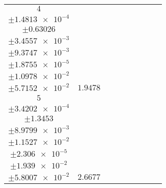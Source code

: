 \documentclass[8pt]{article}
\begin{document}
\begin{longtable}[l]{c c c c c c c c c}
$\num{4}$ & \begin{tabular}[c]{@{}c@{}}$\num{2.765e-2}$ \\ $\pm\num{1.4813e-4}$\end{tabular} & \begin{tabular}[c]{@{}c@{}}$\num{-0.87193}$ \\ $\pm\num{0.63026}$\end{tabular} & \begin{tabular}[c]{@{}c@{}}$\num{-3.7147}$ \\ $\pm\num{3.4557e-3}$\end{tabular} & \begin{tabular}[c]{@{}c@{}}$\num{1.5709e+3}$ \\ $\pm\num{9.3747e-3}$\end{tabular} & \begin{tabular}[c]{@{}c@{}}$\num{3.1426}$ \\ $\pm\num{1.8755e-5}$\end{tabular} & \begin{tabular}[c]{@{}c@{}}$\num{2.4041}$ \\ $\pm\num{1.0978e-2}$\end{tabular} & \begin{tabular}[c]{@{}c@{}}$\num{4.2538}$ \\ $\pm\num{5.7152e-2}$\end{tabular} & $\num{1.9478}$\\
$\num{5}$ & \begin{tabular}[c]{@{}c@{}}$\num{4.1381e-2}$ \\ $\pm\num{3.4202e-4}$\end{tabular} & \begin{tabular}[c]{@{}c@{}}$\num{-0.27305}$ \\ $\pm\num{1.3453}$\end{tabular} & \begin{tabular}[c]{@{}c@{}}$\num{-1.9161}$ \\ $\pm\num{8.9799e-3}$\end{tabular} & \begin{tabular}[c]{@{}c@{}}$\num{1.5727e+3}$ \\ $\pm\num{1.1527e-2}$\end{tabular} & \begin{tabular}[c]{@{}c@{}}$\num{3.1463}$ \\ $\pm\num{2.306e-5}$\end{tabular} & \begin{tabular}[c]{@{}c@{}}$\num{3.2843}$ \\ $\pm\num{1.939e-2}$\end{tabular} & \begin{tabular}[c]{@{}c@{}}$\num{5.5686}$ \\ $\pm\num{5.8007e-2}$\end{tabular} & $\num{2.6677}$\\

\end{longtable}
\end{document}
